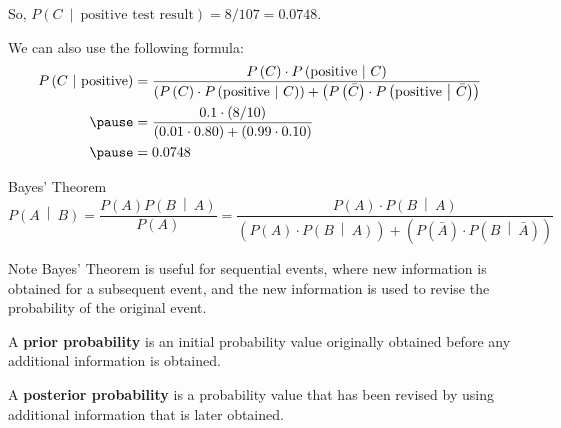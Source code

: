 \documentclass{beamer}
\newcommand{\prob}[1]{P\left(#1\right)}
\newcommand{\condprob}[2]{\prob{#1~\middle|~#2}}
\begin{document}
\begin{frame}
\begin{example}
{So, $\condprob{C}{\text{positive test result}}=8/107=0.0748$.\pause

\vspace{1mm}
We can also use the following formula:
\begin{equation*}
\begin{aligned}
\condprob{C}{\text{positive}}
&=\dfrac{\prob{C}\cdot\condprob{\text{positive}}{C}}{\left(\prob{C}\cdot\condprob{\text{positive}}{C}\right)+\left(\prob{\bar{C}}\cdot\condprob{\text{positive}}{\bar{C}}\right)}\\\pause
&=\dfrac{0.1\cdot(8/10)}{\left(0.01\cdot0.80\right)+\left(0.99\cdot0.10\right)}\\\pause
&=0.0748
\end{aligned}
\end{equation*}
\vspace{-2.2mm}
}
\end{example}
\end{frame}

\begin{frame}
\begin{block}{Bayes' Theorem}
\begin{equation*}
\condprob{A}{B}=\dfrac{\prob{A}\condprob{B}{A}}{\prob{A}} = \dfrac{\prob{A}\cdot\condprob{B}{A}}{\left(\prob{A}\cdot\condprob{B}{A}\right)+\left(\prob{\bar{A}}\cdot\condprob{B}{\bar{A}}\right)}
\end{equation*}
\end{block}\pause

\begin{block}{Note}
Bayes' Theorem is useful for sequential events, where new information is obtained for a subsequent event, and the new information is used to revise the probability of the original event.
\end{block}\pause

\begin{definition}
A \textbf{prior probability} is an initial probability value originally obtained before any additional information is obtained.
\end{definition}\pause

\begin{definition}
A \textbf{posterior probability} is a probability value that has been revised by using additional information that is later obtained.
\end{definition}
\end{frame}
\end{document}
